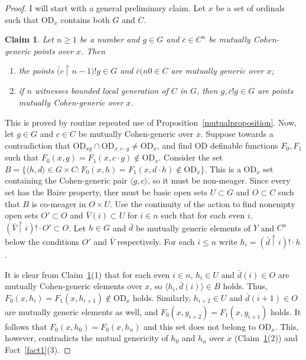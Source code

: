 \documentclass{article}
\newcommand{\vd}{\mathrm{OD}}
\newtheorem{claim}[theorem]{Claim}
\theoremstyle{definition}
\begin{document}
\begin{proof}
I will start with a general preliminary claim. Let $x$ be a set of ordinals such that $\vd_x$ contains both $G$ and $C$.

\begin{claim}
\label{toughclaim}
Let $n\geq 1$ be a number and $g\in G$ and $\bar c\in C^n$ be mutually Cohen-generic points over $x$. Then

\begin{enumerate}
\item the points $\bar (c\restriction n-1)! g\in G$ and $\bar c(n0\in C$ are mutually generic over $x$;
\item if $n$ witnesses bounded local generation of $C$ in $G$, then $g, \bar c!g\in G$ are points mutually Cohen-generic over $x$.
\end{enumerate}
\end{claim}

\noindent This is proved by routine repeated use of Proposition~\ref{mutualproposition}. Now, let $g\in G$ and $c\in C$ be mutually Cohen-generic over $x$. Suppose towards a contradiction that $\vd_{xg}\cap\vd_{x, c\cdot g}\neq\vd_x$, and find $\vd$ definable functions $F_0, F_1$ such that $F_0(x, g)=F_1(x, c\cdot g)\notin\vd_x$. Consider the set $B=\{\langle h, d\rangle\in G\times C\colon F_0(x, h)=F_1(x, d\cdot h)\notin\vd_x\}$. This is a $\vd_x$ set containing the Cohen-generic pair $\langle g, c\rangle$, so it must be non-meager. Since every set has the Baire property, ther must be basic open sets $U\subset G$ and $O\subset C$ such that $B$ is co-meager in $O\times U$. Use the continuity of the action to find nonempty open sets $O'\subset O$ and $\bar V(i)\subset U$ for $i\in n$ such that for each even $i$, $(\bar V\restriction i)!\cdot O'\subset O$. Let $h\in G$ and $\bar d$ be mutually generic elements of $Y$ and $C^n$ below the conditions $O'$ and $\bar V$ respectively. For each $i\leq n$ write $h_i=(\bar d\restriction i)!\cdot h$.  

It is clear from Claim~\ref{toughclaim}(1) that for each even $i\in n$, $h_i\in U$ and $\bar d(i)\in O$ are mutually Cohen-generic elements over $x$, so $\langle h_i, \bar d(i)\rangle\in B$ holds. Thus, $F_0(x, h_i)=F_1(x, h_{i+1})\notin\vd_x$ holds. Similarly, $h_{i+2}\in U$ and $\bar d(i+1)\in O$ are mutually generic elements as well, and $F_0(x, y_{i+2})=F_1(x, y_{i+1})$ holds. It follows that $F_0(x, h_0)=F_0(x, h_n)$ and this set does not belong to $\vd_x$. This, however, contradicts the mutual genericity of $h_0$ and $h_n$ over $x$ (Claim~\ref{toughclaim}(2)) and Fact~\ref{fact1}(3).
\end{proof}
\end{document}

